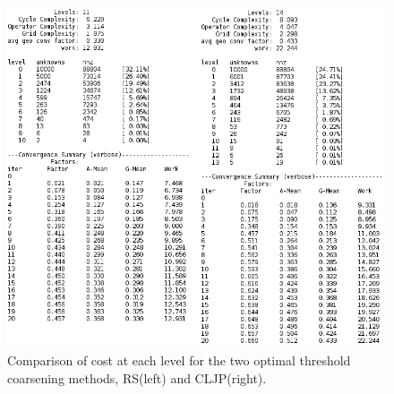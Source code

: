 \documentclass[letterpaper,10pt]{article}
\begin{document}
\begin{figure}[!htb]
\centering
\includegraphics[width=1\textwidth]{RS46CLJP36tab.PNG}
\caption{Comparison of cost at each level for the two optimal threshold coarsening methods, RS(left) and CLJP(right).}
\end{figure}
\end{document}
